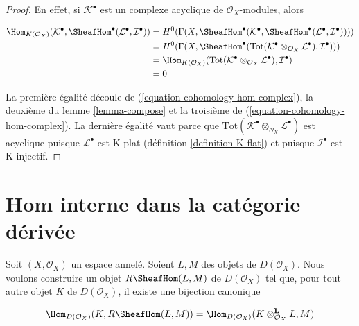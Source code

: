 \begin{proof}

En effet, si $\mathcal{K}^\bullet$ est un complexe acyclique de
$\mathcal{O}_X$-modules, alors

\begin{align*}
\Hom_{K(\mathcal{O}_X)}(\mathcal{K}^\bullet,
\SheafHom^\bullet(\mathcal{L}^\bullet, \mathcal{I}^\bullet))
& =
H^0(\Gamma(X,
\SheafHom^\bullet(\mathcal{K}^\bullet,
\SheafHom^\bullet(\mathcal{L}^\bullet, \mathcal{I}^\bullet)))) \\
& =
H^0(\Gamma(X, \SheafHom^\bullet(\text{Tot}(
\mathcal{K}^\bullet \otimes_{\mathcal{O}_X} \mathcal{L}^\bullet),
\mathcal{I}^\bullet))) \\
& =
\Hom_{K(\mathcal{O}_X)}(
\text{Tot}(\mathcal{K}^\bullet \otimes_{\mathcal{O}_X} \mathcal{L}^\bullet),
\mathcal{I}^\bullet) \\
& =
0
\end{align*}

La première égalité découle de (\ref{equation-cohomology-hom-complex}), la deuxième du lemme \ref{lemma-compose} et la troisième de (\ref{equation-cohomology-hom-complex}). La dernière égalité vaut parce que
$\text{Tot}(\mathcal{K}^\bullet \otimes_{\mathcal{O}_X} \mathcal{L}^\bullet)$
est acyclique puisque $\mathcal{L}^\bullet$ est K-plat (définition \ref{definition-K-flat}) et puisque $\mathcal{I}^\bullet$
est K-injectif.

\end{proof}







\section{Hom interne dans la catégorie dérivée}

\label{section-internal-hom}

\noindent

Soit $(X, \mathcal{O}_X)$ un espace annelé. Soient $L, M$ des objets de $D(\mathcal{O}_X)$. Nous voulons construire un objet
$R\SheafHom(L, M)$ de $D(\mathcal{O}_X)$ tel que, pour tout autre objet $K$ de $D(\mathcal{O}_X)$, il existe une bijection canonique

\begin{equation}
\label{equation-internal-hom}
\Hom_{D(\mathcal{O}_X)}(K, R\SheafHom(L, M))
=
\Hom_{D(\mathcal{O}_X)}(K \otimes_{\mathcal{O}_X}^\mathbf{L} L, M)
\end{equation}

